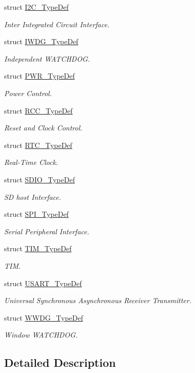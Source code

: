 \begin{DoxyCompactItemize}
struct \mbox{\hyperlink{struct_i2_c___type_def}{I2\+C\+\_\+\+Type\+Def}}
\begin{DoxyCompactList}\small\item\em Inter Integrated Circuit Interface. \end{DoxyCompactList}\item 
struct \mbox{\hyperlink{struct_i_w_d_g___type_def}{I\+W\+D\+G\+\_\+\+Type\+Def}}
\begin{DoxyCompactList}\small\item\em Independent W\+A\+T\+C\+H\+D\+OG. \end{DoxyCompactList}\item 
struct \mbox{\hyperlink{struct_p_w_r___type_def}{P\+W\+R\+\_\+\+Type\+Def}}
\begin{DoxyCompactList}\small\item\em Power Control. \end{DoxyCompactList}\item 
struct \mbox{\hyperlink{struct_r_c_c___type_def}{R\+C\+C\+\_\+\+Type\+Def}}
\begin{DoxyCompactList}\small\item\em Reset and Clock Control. \end{DoxyCompactList}\item 
struct \mbox{\hyperlink{struct_r_t_c___type_def}{R\+T\+C\+\_\+\+Type\+Def}}
\begin{DoxyCompactList}\small\item\em Real-\/\+Time Clock. \end{DoxyCompactList}\item 
struct \mbox{\hyperlink{struct_s_d_i_o___type_def}{S\+D\+I\+O\+\_\+\+Type\+Def}}
\begin{DoxyCompactList}\small\item\em SD host Interface. \end{DoxyCompactList}\item 
struct \mbox{\hyperlink{struct_s_p_i___type_def}{S\+P\+I\+\_\+\+Type\+Def}}
\begin{DoxyCompactList}\small\item\em Serial Peripheral Interface. \end{DoxyCompactList}\item 
struct \mbox{\hyperlink{struct_t_i_m___type_def}{T\+I\+M\+\_\+\+Type\+Def}}
\begin{DoxyCompactList}\small\item\em T\+IM. \end{DoxyCompactList}\item 
struct \mbox{\hyperlink{struct_u_s_a_r_t___type_def}{U\+S\+A\+R\+T\+\_\+\+Type\+Def}}
\begin{DoxyCompactList}\small\item\em Universal Synchronous Asynchronous Receiver Transmitter. \end{DoxyCompactList}\item 
struct \mbox{\hyperlink{struct_w_w_d_g___type_def}{W\+W\+D\+G\+\_\+\+Type\+Def}}
\begin{DoxyCompactList}\small\item\em Window W\+A\+T\+C\+H\+D\+OG. \end{DoxyCompactList}\end{DoxyCompactItemize}


\subsection{Detailed Description}
